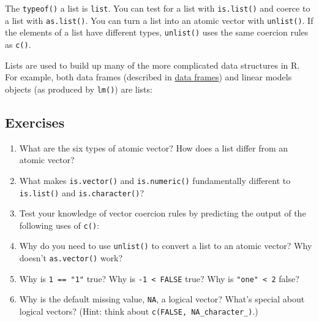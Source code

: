 The \texttt{typeof()} a list is \texttt{list}. You can test for a list
with \texttt{is.list()} and coerce to a list with \texttt{as.list()}.
You can turn a list into an atomic vector with \texttt{unlist()}. If the
elements of a list have different types, \texttt{unlist()} uses the same
coercion rules as \texttt{c()}.

Lists are used to build up many of the more complicated data structures
in R. For example, both data frames (described in
\hyperref[data-frames]{data frames}) and linear models objects (as
produced by \texttt{lm()}) are lists:

\begin{Shaded}
\begin{Highlighting}[]

\StringTok{ }\StringTok{ } 
\end{Highlighting}
\end{Shaded}

\subsection{Exercises}

\begin{enumerate}
\def\labelenumi{\arabic{enumi}.}
\item
  What are the six types of atomic vector? How does a list differ from
  an atomic vector?
\item
  What makes \texttt{is.vector()} and \texttt{is.numeric()}
  fundamentally different to \texttt{is.list()} and
  \texttt{is.character()}?
\item
  Test your knowledge of vector coercion rules by predicting the output
  of the following uses of \texttt{c()}:

\begin{Shaded}
\begin{Highlighting}[]
\NormalTok{(}\NormalTok{, }\NormalTok{)}
\NormalTok{(}\NormalTok{, }\NormalTok{)}
\NormalTok{(}\NormalTok{(}\NormalTok{), }\NormalTok{)}
\NormalTok{(}
\end{Highlighting}
\end{Shaded}
\item
  Why do you need to use \texttt{unlist()} to convert a list to an
  atomic vector? Why doesn't \texttt{as.vector()} work?
\item
  Why is \texttt{1 == "1"} true? Why is \texttt{-1 \textless{} FALSE}
  true? Why is \texttt{"one" \textless{} 2} false?
\item
  Why is the default missing value, \texttt{NA}, a logical vector?
  What's special about logical vectors? (Hint: think about
  \texttt{c(FALSE, NA\_character\_)}.)
\end{enumerate}

